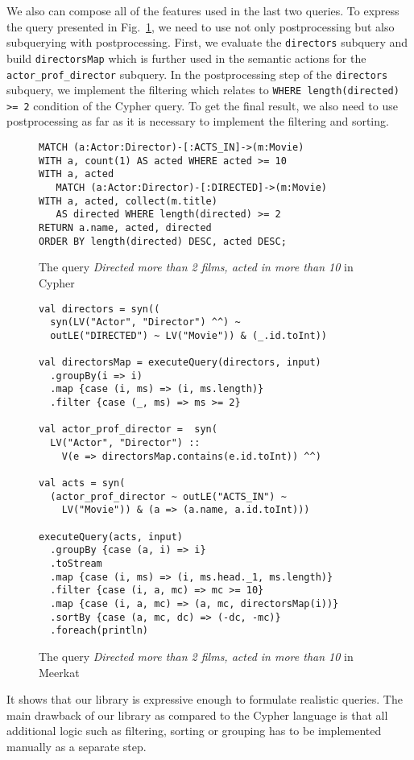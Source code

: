 We also can compose all of the features used in the last two queries.
To express the query presented in Fig.~\ref{fig:Q3_C}, we need to use not only postprocessing but also subquerying with postprocessing.
First, we evaluate the \lstinline{directors} subquery and build \lstinline{directorsMap} which is further used in the semantic actions for the \lstinline{actor_prof_director} subquery.
In the postprocessing step of the \lstinline{directors} subquery, we implement the filtering which relates to \lstinline{WHERE length(directed) >= 2} condition of the Cypher query.
To get the final result, we also need to use postprocessing as far as it is necessary to implement the filtering and sorting.

\begin{figure}[h]
\begin{lstlisting}
MATCH (a:Actor:Director)-[:ACTS_IN]->(m:Movie)
WITH a, count(1) AS acted WHERE acted >= 10
WITH a, acted
   MATCH (a:Actor:Director)-[:DIRECTED]->(m:Movie)
WITH a, acted, collect(m.title)
   AS directed WHERE length(directed) >= 2
RETURN a.name, acted, directed
ORDER BY length(directed) DESC, acted DESC;
\end{lstlisting}
\caption{The query \emph{Directed more than 2 films, acted in more than 10} in Cypher}
\label{fig:Q3_C}
\end{figure}


\begin{figure}[h]
\begin{lstlisting}
val directors = syn((
  syn(LV("Actor", "Director") ^^) ~
  outLE("DIRECTED") ~ LV("Movie")) & (_.id.toInt))

val directorsMap = executeQuery(directors, input)
  .groupBy(i => i)
  .map {case (i, ms) => (i, ms.length)}
  .filter {case (_, ms) => ms >= 2}

val actor_prof_director =  syn(
  LV("Actor", "Director") ::
    V(e => directorsMap.contains(e.id.toInt)) ^^)

val acts = syn(
  (actor_prof_director ~ outLE("ACTS_IN") ~
    LV("Movie")) & (a => (a.name, a.id.toInt)))

executeQuery(acts, input)
  .groupBy {case (a, i) => i}
  .toStream
  .map {case (i, ms) => (i, ms.head._1, ms.length)}
  .filter {case (i, a, mc) => mc >= 10}
  .map {case (i, a, mc) => (a, mc, directorsMap(i))}
  .sortBy {case (a, mc, dc) => (-dc, -mc)}
  .foreach(println)

\end{lstlisting}
\caption{The query \emph{Directed more than 2 films, acted in more than 10} in Meerkat}
\label{fig:helpers}
\end{figure}

It shows that our library is expressive enough to formulate realistic queries.
The main drawback of our library as compared to the Cypher language is that all additional logic such as
filtering, sorting or grouping has to be implemented manually as a separate step.